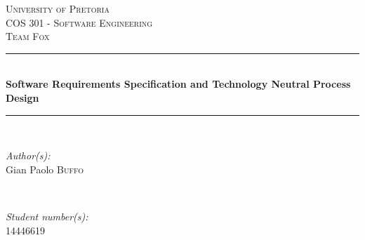 \documentclass[a4paper,12pt]{article}
\begin{document}
\begin{titlepage}

\newcommand{\HRule}{\rule{\linewidth}{0.5mm}} %

\center %
 

\textsc{\LARGE University of Pretoria}\\[1.5cm] 
\textsc{\Large COS 301 - Software Engineering}\\[0.5cm] 
\textsc{\large Team Fox}\\[0.5cm] 


\HRule \\[0.4cm]
{ \huge \bfseries Software Requirements Specification and Technology Neutral Process Design}\\[0.4cm] 
\HRule \\[1.5cm]
 

\begin{minipage}{0.4\textwidth}
\begin{flushleft} \large
\emph{Author(s):}\\
Gian Paolo \textsc{Buffo} %
\end{flushleft}
\end{minipage}
~
\begin{minipage}{0.4\textwidth}
\begin{flushright} \large
\emph{Student number(s):} \\
14446619 %
\end{flushright}
\end{minipage}\\[4cm]



\end{titlepage}
\end{document}
